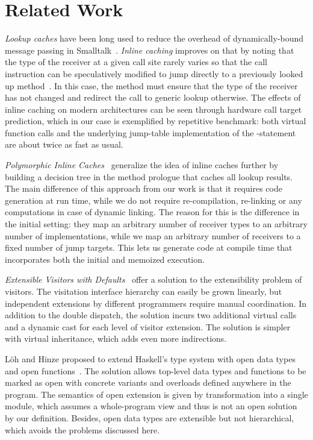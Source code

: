 \section{Related Work} %
\label{sec:rw}

\emph{Lookup caches} have been long used to reduce the overhead of 
dynamically-bound message passing in Smalltalk~\cite{UngarPatterson83}. 
\emph{Inline caching} improves on that by noting that the type of the receiver at a given 
call site rarely varies so that the call instruction can be speculatively 
modified to jump directly to a previously looked up method~\cite{Deutsch84}. 
In this case, the method must ensure that the type of the receiver has 
not changed and redirect the call to generic lookup otherwise. The effects of 
inline caching on modern architectures can be seen through hardware call target 
prediction, which in our case is exemplified by repetitive benchmark: both 
virtual function calls and the underlying jump-table implementation of the 
-statement are about twice as fast as usual.

\emph{Polymorphic Inline Caches}~\cite{Holzle:Chambers:Ungar:91} generalize the 
idea of inline caches further by building a decision tree in the method prologue 
that caches all lookup results. The main difference of this approach from our 
work is that it requires code generation at run time, while we do not require
re-compilation, re-linking or any computations in case of dynamic linking.
The reason for this is the difference in the initial setting: they map an
arbitrary number of receiver types to an arbitrary number of implementations, while 
we map an arbitrary number of receivers to a fixed number of jump 
targets. This lets us generate code at compile time that incorporates both the 
initial and memoized execution.

\emph{Extensible Visitors with Defaults}~\cite[]{Zenger:2001} 
offer a solution to the extensibility problem of visitors. The visitation interface 
hierarchy can easily be grown linearly, but independent extensions by different  
programmers require manual coordination. In addition to the double dispatch, the 
solution incurs two additional virtual calls and a dynamic cast for each 
level of visitor extension. The solution is simpler with virtual inheritance, 
which adds even more indirections.

L\"{o}h and Hinze proposed to extend Haskell's type system with open data types 
and open functions~\cite{LohHinze2006}. The solution allows top-level data types 
and functions to be marked as open with concrete variants and overloads defined 
anywhere in the program. The semantics of open extension is given by 
transformation into a single module, which assumes a whole-program view and thus 
is not an open solution by our definition. Besides, open data types are extensible but not 
hierarchical, which avoids the problems discussed here.

